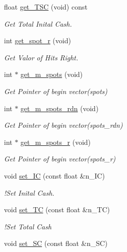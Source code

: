 \begin{DoxyCompactItemize}
float \hyperlink{classKenoBet_a15782d60d2e9b76f359963865a714a04}{get\+\_\+\+T\+SC} (void) const
\begin{DoxyCompactList}\small\item\em Get Total Inital Cash. \end{DoxyCompactList}\item 
int \hyperlink{classKenoBet_a79f26e472d9a60894e25094a37d06eb6}{get\+\_\+spot\+\_\+r} (void)
\begin{DoxyCompactList}\small\item\em Get Valor of Hits Right. \end{DoxyCompactList}\item 
int $\ast$ \hyperlink{classKenoBet_a386ab5f7108fd2df3518f37bfca2b2ef}{get\+\_\+m\+\_\+spots} (void)
\begin{DoxyCompactList}\small\item\em Get Pointer of begin vector(spots) \end{DoxyCompactList}\item 
int $\ast$ \hyperlink{classKenoBet_a8106aa1f149ba3043a8219453e1af3a1}{get\+\_\+m\+\_\+spots\+\_\+rdn} (void)
\begin{DoxyCompactList}\small\item\em Get Pointer of begin vector(spots\+\_\+rdn) \end{DoxyCompactList}\item 
int $\ast$ \hyperlink{classKenoBet_a1a124437ed672df3e4e7d195d9716540}{get\+\_\+m\+\_\+spots\+\_\+r} (void)
\begin{DoxyCompactList}\small\item\em Get Pointer of begin vector(spots\+\_\+r) \end{DoxyCompactList}\item 
void \hyperlink{classKenoBet_a7b74641d226e6b2ea45bc60889f32781}{set\+\_\+\+IC} (const float \&n\+\_\+\+IC)
\begin{DoxyCompactList}\small\item\em !\+Set Inital Cash. \end{DoxyCompactList}\item 
void \hyperlink{classKenoBet_aa9be1ef95a09fcc293e7c73e763ff176}{set\+\_\+\+TC} (const float \&n\+\_\+\+TC)
\begin{DoxyCompactList}\small\item\em !\+Set Total Cash \end{DoxyCompactList}\item 
void \hyperlink{classKenoBet_a4865fd866acc1500bde749d8d15ddf16}{set\+\_\+\+SC} (const float \&n\+\_\+\+SC)

\end{DoxyCompactItemize}
